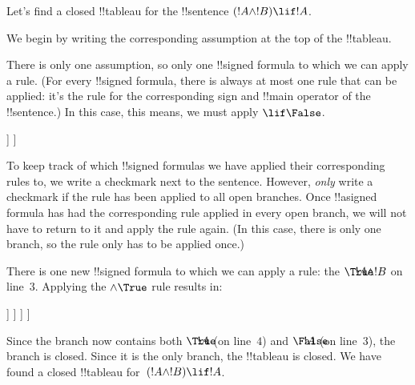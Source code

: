 \documentclass[../../../include/open-logic-section]{subfiles}
\begin{document}
      {}
      {}


\begin{ex}
Let's find a closed !!{tableau} for the !!{sentence} $(!A \land !B) \lif !A$.

We begin by writing the corresponding assumption at the top of the
!!{tableau}.
\begin{oltableau}
  [\sFmla{\False}{(\formula{A} \land \formula{B}) \lif \formula{A}},
    just = \TAss]
\end{oltableau}

There is only one assumption, so only one !!{signed formula} to which
we can apply a rule. (For every !!{signed formula}, there is always at
most one rule that can be applied: it's the rule for the corresponding
sign and !!{main operator} of the !!{sentence}.) In this case, this
means, we must apply $\TRule{\False}{\lif}$.
\begin{oltableau}
  [\sFmla{\False}{(\formula{A} \land \formula{B}) \lif \formula{A}},
    checked, just = \TAss
    [\sFmla{\True}{\formula{A} \land \formula{B}},
      just={\TRule{\False}{\lif}[1]}
      [\sFmla{\False}{\formula{A}}, just={\TRule{\False}{\lif}[1]}]
    ]
  ]
\end{oltableau}
To keep track of which !!{signed formula}s we have applied their
corresponding rules to, we write a checkmark next to the
sentence. However, \emph{only} write a checkmark if the rule has been
applied to all open branches. Once !!a{signed formula} has had the
corresponding rule applied in every open branch, we will not have to
return to it and apply the rule again. (In this case, there is only
one branch, so the rule only has to be applied once.)

There is one new !!{signed formula} to which we can apply a rule: the
$\sFmla{\True}{!A \land !B}$ on line~$3$. Applying the
$\TRule{\True}{\land}$ rule results in:
\begin{oltableau}
  [\sFmla{\False}{(\formula{A} \land \formula{B}) \lif \formula{A}},
    checked, just = \TAss
    [\sFmla{\True}{\formula{A} \land \formula{B}},
      just={\TRule{\False}{\lif}[1]}, checked
      [\sFmla{\False}{\formula{A}}, just={\TRule{\False}{\lif}[1]}
        [\sFmla{\True}{\formula{A}}, just={\TRule{\True}{\land}[2]}
          [\sFmla{\True}{\formula{B}}, just={\TRule{\True}{\land}[2]}, close
          ]
        ]
      ]
    ]
  ]
\end{oltableau}
Since the branch now contains both $\sFmla{\True}{!A}$ (on line~$4$)
and $\sFmla{\False}{!A}$ (on line~$3$), the branch is closed. Since it
is the only branch, the !!{tableau} is closed. We have found
a closed !!{tableau} for~$(!A \land !B) \lif !A$.
\end{ex}
\end{document}

